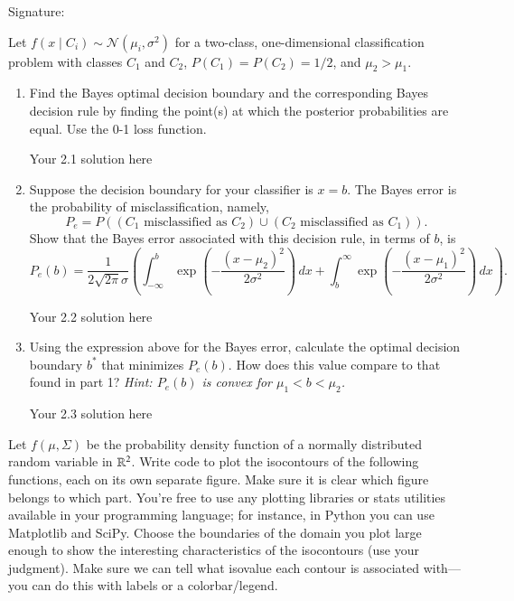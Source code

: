 \documentclass[11pt]{article}
\begin{document}
Signature: \hrulefill




Let $f(x \mid C_i) \sim \mathcal{N}(\mu_i,\sigma^2)$ for
a two-class, one-dimensional classification problem with
classes $C_{1}$ and $C_{2}$,
$P(C_1)=P(C_2)=1/2$, and $\mu_{2} > \mu_{1}$.
\begin{enumerate}
\item
Find the Bayes optimal decision boundary and the corresponding Bayes decision rule by finding the point(s) at which the posterior probabilities are equal.
Use the 0-1 loss function.
\begin{solution}
Your 2.1 solution here
\end{solution}

\item
Suppose the decision boundary for your classifier is $x = b$. The Bayes error is the probability of misclassification, namely, 
$$P_{e} = P((C_1 \text{ misclassified as } C_2) \cup (C_2 \text{ misclassified as } C_1)).$$
Show that the Bayes error associated with this decision rule, in terms of $b$, is
\begin{equation*}
P_e(b) = \frac{1}{2\sqrt{2\pi}\sigma}\left(\int_{-\infty}^{b} \exp \left(-\frac{(x - \mu_2)^2}{2\sigma^2}\right) \, dx + \int_b^\infty \exp \left(-\frac{(x-\mu_1)^2}{2\sigma^2} \right) \, dx\right).
\end{equation*}
\begin{solution}
Your 2.2 solution here
\end{solution}
\item
Using the expression above for the Bayes error, calculate the optimal decision boundary $b^*$ that minimizes $P_e(b)$. How does this value compare to that found in part 1? \emph{Hint: $P_e(b)$ is convex for $\mu_1 < b < \mu_2$.}

\begin{solution}
Your 2.3 solution here
\end{solution}
\end{enumerate}





Let $f(\mu,\Sigma)$ be the probability density function of a normally distributed random variable in $\mathbb{R}^2$.
Write code to plot the isocontours of the following functions, each on its own separate figure. Make sure it is clear which figure belongs to which part.
You're free to use any plotting libraries or stats utilities available in your programming language; for instance, in Python you can use Matplotlib and SciPy.
Choose the boundaries of the domain you plot large enough to show the interesting characteristics of the isocontours (use your judgment).
Make sure we can tell what isovalue each contour is associated with---you can do this with labels or a colorbar/legend.
\end{document}
